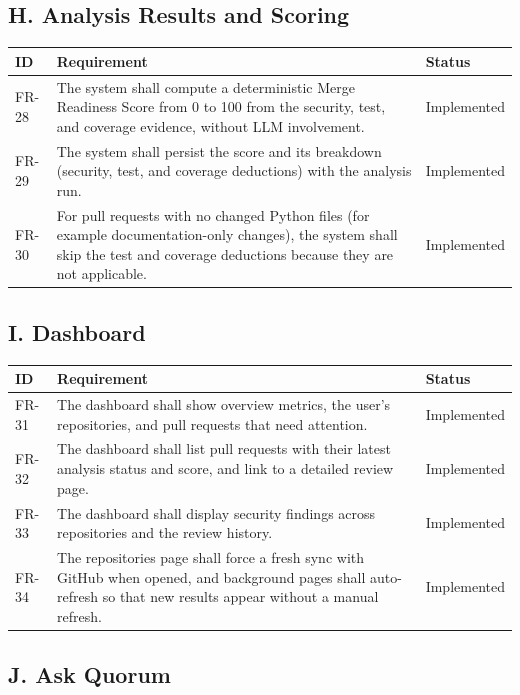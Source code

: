 \subsection{H. Analysis Results and Scoring}

\begin{longtable}{@{}p{1.4cm}p{11.6cm}p{2.0cm}@{}}
\toprule
\textbf{ID} & \textbf{Requirement} & \textbf{Status} \\
\midrule
\endhead
FR-28 & The system shall compute a deterministic Merge Readiness Score from 0
to 100 from the security, test, and coverage evidence, without LLM
involvement. & Implemented \\
FR-29 & The system shall persist the score and its breakdown (security, test,
and coverage deductions) with the analysis run. & Implemented \\
FR-30 & For pull requests with no changed Python files (for example
documentation-only changes), the system shall skip the test and coverage
deductions because they are not applicable. & Implemented \\
\bottomrule
\end{longtable}

\subsection{I. Dashboard}

\begin{longtable}{@{}p{1.4cm}p{11.6cm}p{2.0cm}@{}}
\toprule
\textbf{ID} & \textbf{Requirement} & \textbf{Status} \\
\midrule
\endhead
FR-31 & The dashboard shall show overview metrics, the user's repositories,
and pull requests that need attention. & Implemented \\
FR-32 & The dashboard shall list pull requests with their latest analysis
status and score, and link to a detailed review page. & Implemented \\
FR-33 & The dashboard shall display security findings across repositories and
the review history. & Implemented \\
FR-34 & The repositories page shall force a fresh sync with GitHub when opened,
and background pages shall auto-refresh so that new results appear without a
manual refresh. & Implemented \\
\bottomrule
\end{longtable}

\subsection{J. Ask Quorum}

